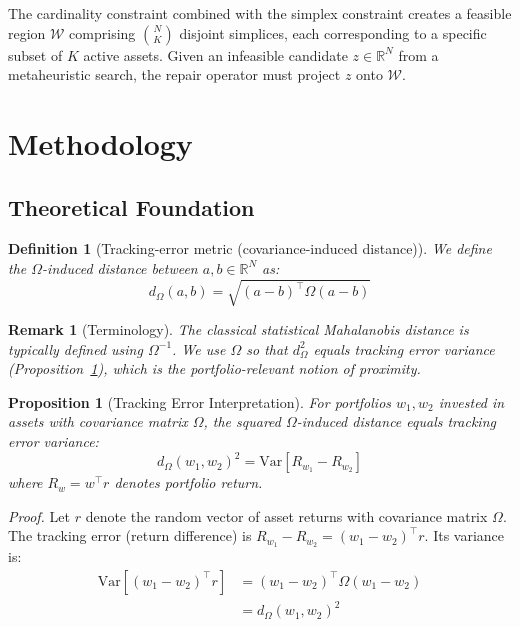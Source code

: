 \documentclass[10pt,twocolumn,a4paper]{article}
\newtheorem{proposition}{Proposition}
\newtheorem{definition}{Definition}
\newtheorem{remark}{Remark}
\begin{document}
The cardinality constraint combined with the simplex constraint creates a feasible region $\mathcal{W}$ comprising $\binom{N}{K}$ disjoint simplices, each corresponding to a specific subset of $K$ active assets. Given an infeasible candidate $z \in \mathbb{R}^N$ from a metaheuristic search, the repair operator must project $z$ onto $\mathcal{W}$.

\section{Methodology}
\label{sec:method}

\subsection{Theoretical Foundation}

\begin{definition}[Tracking-error metric (covariance-induced distance)]
We define the $\Omega$-induced distance between $a, b \in \mathbb{R}^N$ as:
\begin{equation}
d_\Omega(a, b) = \sqrt{(a-b)^\top \Omega (a-b)}
\end{equation}
\end{definition}

\begin{remark}[Terminology]
The classical statistical Mahalanobis distance is typically defined using $\Omega^{-1}$. We use $\Omega$ so that $d_\Omega^2$ equals tracking error variance (Proposition~\ref{prop:tracking}), which is the portfolio-relevant notion of proximity.
\end{remark}

\begin{proposition}[Tracking Error Interpretation]
\label{prop:tracking}
For portfolios $w_1, w_2$ invested in assets with covariance matrix $\Omega$, the squared $\Omega$-induced distance equals tracking error variance:
\begin{equation}
d_\Omega(w_1, w_2)^2 = \text{Var}[R_{w_1} - R_{w_2}]
\end{equation}
where $R_w = w^\top r$ denotes portfolio return.
\end{proposition}

\noindent\textit{Proof.}
Let $r$ denote the random vector of asset returns with covariance matrix $\Omega$. The tracking error (return difference) is $R_{w_1} - R_{w_2} = (w_1 - w_2)^\top r$. Its variance is:
\begin{equation}
\begin{aligned}
\text{Var}[(w_1 - w_2)^\top r] &= (w_1 - w_2)^\top \Omega (w_1 - w_2) \\
&= d_\Omega(w_1, w_2)^2
\end{aligned}
\end{equation}
\end{document}
